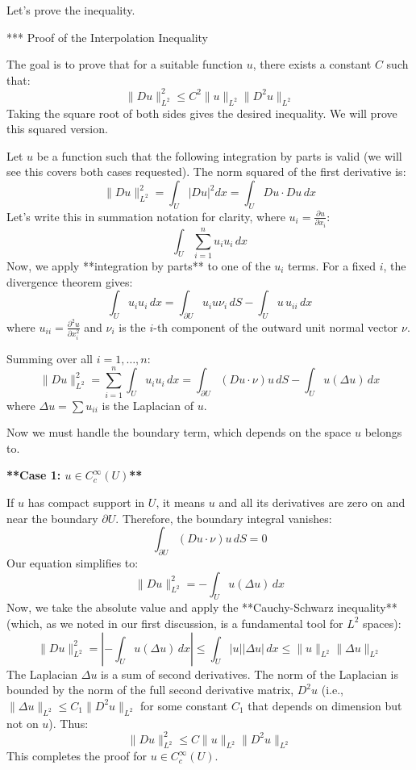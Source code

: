 \documentclass[12pt,a4paper]{report}
\begin{document}
\begin{enumerate}
\begin{description}
\end{description}

Let's prove the inequality.

*** Proof of the Interpolation Inequality

The goal is to prove that for a suitable function $u$, there exists a constant $C$ such that:
\[
\|Du\|_{L^2}^2 \le C^2 \|u\|_{L^2}\|D^2u\|_{L^2}
\]
Taking the square root of both sides gives the desired inequality. We will prove this squared version.

Let $u$ be a function such that the following integration by parts is valid (we will see this covers both cases requested). The norm squared of the first derivative is:
\[
\|Du\|_{L^2}^2 = \int_U |Du|^2 dx = \int_U Du \cdot Du \, dx
\]
Let's write this in summation notation for clarity, where $u_i = \frac{\partial u}{\partial x_i}$:
\[
\int_U \sum_{i=1}^n u_i u_i \, dx
\]
Now, we apply **integration by parts** to one of the $u_i$ terms. For a fixed $i$, the divergence theorem gives:
\[
\int_U u_i u_i \, dx = \int_{\partial U} u_i u \nu_i \, dS - \int_U u \, u_{ii} \, dx
\]
where $u_{ii} = \frac{\partial^2 u}{\partial x_i^2}$ and $\nu_i$ is the $i$-th component of the outward unit normal vector $\nu$.

Summing over all $i=1, \dots, n$:
\[
\|Du\|_{L^2}^2 = \sum_{i=1}^n \int_U u_i u_i \, dx = \int_{\partial U} (Du \cdot \nu) u \, dS - \int_U u (\Delta u) \, dx
\]
where $\Delta u = \sum u_{ii}$ is the Laplacian of $u$.

Now we must handle the boundary term, which depends on the space $u$ belongs to.

\begin{description}

\item \textbf{**Case 1: $u \in C_c^\infty(U)$**}

If $u$ has compact support in $U$, it means $u$ and all its derivatives are zero on and near the boundary $\partial U$. Therefore, the boundary integral vanishes:
\[
\int_{\partial U} (Du \cdot \nu) u \, dS = 0
\]
Our equation simplifies to:
\[
\|Du\|_{L^2}^2 = -\int_U u (\Delta u) \, dx
\]
Now, we take the absolute value and apply the **Cauchy-Schwarz inequality** (which, as we noted in our first discussion, is a fundamental tool for $L^2$ spaces):
\[
\|Du\|_{L^2}^2 = \left| -\int_U u (\Delta u) \, dx \right| \le \int_U |u| |\Delta u| \, dx \le \|u\|_{L^2} \|\Delta u\|_{L^2}
\]
The Laplacian $\Delta u$ is a sum of second derivatives. The norm of the Laplacian is bounded by the norm of the full second derivative matrix, $D^2u$ (i.e., $\|\Delta u\|_{L^2} \le C_1 \|D^2u\|_{L^2}$ for some constant $C_1$ that depends on dimension but not on $u$). Thus:
\[
\|Du\|_{L^2}^2 \le C \|u\|_{L^2} \|D^2u\|_{L^2}
\]
This completes the proof for $u \in C_c^\infty(U)$.


\end{description}
\end{enumerate}
\end{document}

